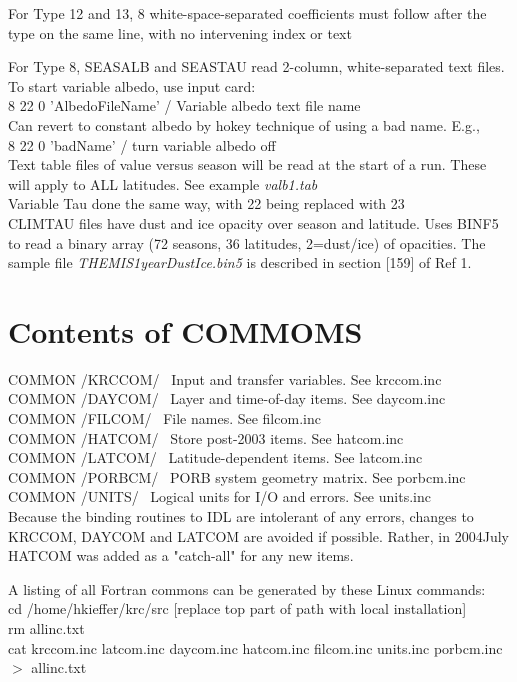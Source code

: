 \documentclass[draft]{article}  %
\newcommand{\qi}{\\ \hspace*{2.em}}      %
\newcommand{\nf}{\textit}  %
\begin{document}
For Type 12 and 13, 8 white-space-separated coefficients must follow after 
the type on the same line, with no intervening index or text 

For Type 8, SEASALB and SEASTAU read 2-column, white-separated text files. \\
To start variable albedo, use input card: 
\qi  8 22 0 'AlbedoFileName' / Variable albedo text file name \\
Can revert to constant albedo by hokey technique of using a bad name. E.g.,
\qi  8 22 0 'badName' / turn variable albedo off \\
Text table files of value versus season will be read at the start of a
run. These will apply to ALL latitudes. See example  \nf{valb1.tab}   \\
Variable Tau done the same way, with 22 being replaced with 23 \\

CLIMTAU files have dust and ice opacity over season and latitude. Uses BINF5 to
read a binary array (72 seasons, 36 latitudes, 2=dust/ice) of opacities. The
sample file \nf{THEMIS1yearDustIce.bin5} is described in section [159] of Ref 1.
 
\section{Contents of COMMOMS } %
 COMMON /KRCCOM/ \ Input and transfer variables. See krccom.inc  
\\ COMMON /DAYCOM/ \ Layer and time-of-day items. See daycom.inc  
\\ COMMON /FILCOM/ \ File names. See filcom.inc  
\\ COMMON /HATCOM/ \ Store post-2003 items. See hatcom.inc  
\\ COMMON /LATCOM/ \ Latitude-dependent items. See latcom.inc  
\\ COMMON /PORBCM/ \ PORB system geometry matrix.  See porbcm.inc  
\\ COMMON /UNITS/ \ Logical units for I/O and errors.  See units.inc  \\


Because the binding routines to IDL are intolerant of any errors, changes to
KRCCOM, DAYCOM and LATCOM are avoided if possible. Rather, in 2004July HATCOM
was added as a "catch-all" for any new items.

A listing of all Fortran commons can be generated by these Linux commands: \\ 
cd /home/hkieffer/krc/src [replace top part of path with local installation] \\ 
rm allinc.txt \\ 
cat krccom.inc latcom.inc daycom.inc hatcom.inc filcom.inc units.inc porbcm.inc $>$ allinc.txt 
              
\end{document}
